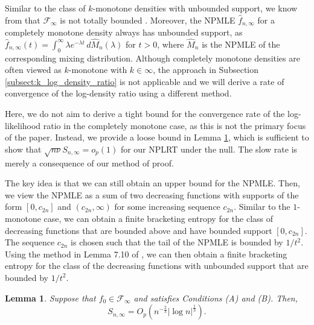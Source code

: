 \documentclass[12pt,letterpaper, twoside, openany]{article}
\theoremstyle{plain}
\newtheorem{lemma}[theorem]{Lemma}
\begin{document}
    Similar to the class of $k$-monotone densities with unbounded support, we know from \cite{gao2009rate} that $\mathcal{F}_\infty$ is not totally bounded . Moreover, the NPMLE $\hat{f}_{n,\infty}$ for a completely monotone density always has unbounded support, as $\hat{f}_{n,\infty}(t) = \int^\infty_0 \lambda e^{-\lambda t} \, d\hat{M}_n(\lambda)$ for $t > 0$, where $\hat{M}_n$ is the NPMLE of the corresponding mixing distribution. Although completely monotone densities are often viewed as $k$-monotone with $k \in \infty$, the approach in Subsection \ref{subsect:k_log_density_ratio} is not applicable and we will derive a rate of convergence of the log-density ratio using a different method. 
    
     Here, we do not aim to derive a tight bound for the convergence rate of the log-likelihood ratio in the completely monotone case, as this is not the primary focus of the paper. Instead, we provide a loose bound in Lemma \ref{lem:new_rate_cm}, which is sufficient to show that $\sqrt{n \nu} S_{n,\infty}= o_p(1)$ for our NPLRT under the null. The slow rate is merely a consequence of our method of proof.

     The key idea is that we can still obtain an upper bound for the NPMLE. Then, we view the NPMLE as a sum of two decreasing functions with supports of the form $[0, c_{2n}]$ and $(c_{2n}, \infty)$ for some increasing sequence $c_{2n}$. Similar to the $1$-monotone case, we can obtain a finite bracketing entropy for the class of decreasing functions that are bounded above and have bounded support $[0, c_{2n}]$. The sequence $c_{2n}$ is chosen such that the tail of the NPMLE is bounded by $1/t^2$. Using the method in Lemma 7.10 of \cite{van2000empirical}, we can then obtain a finite bracketing entropy for the class of the decreasing functions with unbounded support that are bounded by $1/t^2$.
    
    
   
     
    
  \begin{lemma}\label{lem:new_rate_cm}
        Suppose that $f_0\in \mathcal{F}_\infty$ and satisfies Conditions (A) and (B). Then,
        \begin{equation}\label{eq:CM_LRT_rate}
            S_{n,\infty} = O_p\left( n^{-\frac{2}{3}} |\log n |^{\frac{1}{3}}\right).
        \end{equation}
    \end{lemma}
\end{document}
